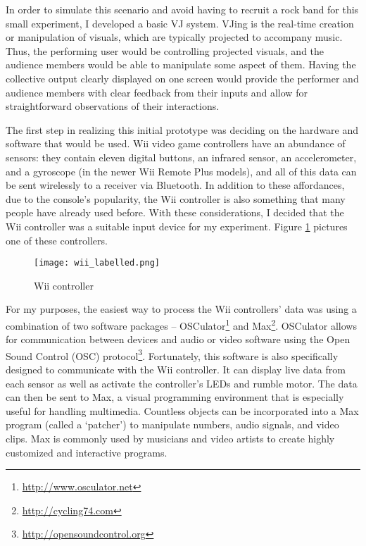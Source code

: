 In order to simulate this scenario and avoid having to recruit a rock band for this small experiment, I developed a basic VJ system. VJing is the real-time creation or manipulation of visuals, which are typically projected to accompany music. Thus, the performing user would be controlling projected visuals, and the audience members would be able to manipulate some aspect of them. Having the collective output clearly displayed on one screen would provide the performer and audience members with clear feedback from their inputs and allow for straightforward observations of their interactions.

The first step in realizing this initial prototype was deciding on the hardware and software that would be used. Wii video game controllers have an abundance of sensors: they contain eleven digital buttons, an infrared sensor, an accelerometer, and a gyroscope (in the newer Wii Remote Plus models), and all of this data can be sent wirelessly to a receiver via Bluetooth. In addition to these affordances, due to the console's popularity, the Wii controller is also something that many people have already used before. With these considerations, I decided that the Wii controller was a suitable input device for my experiment. Figure \ref{prototyping1.6} pictures one of these controllers.

\begin{figure}
	\centering

	\texttt{[image: wii\_labelled.png]}
	\caption{Wii controller}

	\label{prototyping1.6}
\end{figure}

For my purposes, the easiest way to process the Wii controllers' data was using a combination of two software packages -- OSCulator\footnote{\url{http://www.osculator.net}} and Max\footnote{\url{http://cycling74.com}}. OSCulator allows for communication between devices and audio or video software using the Open Sound Control (OSC) protocol\footnote{\url{http://opensoundcontrol.org}}. Fortunately, this software is also specifically designed to communicate with the Wii controller. It can display live data from each sensor as well as activate the controller's LEDs and rumble motor. The data can then be sent to Max, a visual programming environment that is especially useful for handling multimedia. Countless objects can be incorporated into a Max program (called a `patcher') to manipulate numbers, audio signals, and video clips. Max is commonly used by musicians and video artists to create highly customized and interactive programs.

